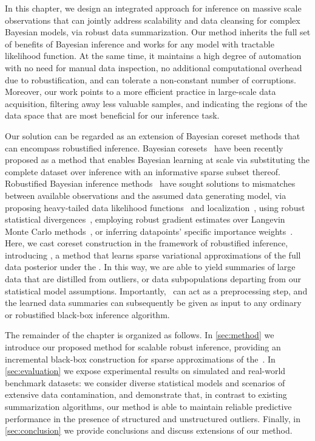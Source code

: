 In this chapter, we design an integrated approach for inference on massive scale observations that can jointly address scalability and data cleansing for complex Bayesian models, via robust data summarization. Our method inherits the full set of benefits of Bayesian inference and works for any model with tractable likelihood function. At the same time, it maintains a high degree of automation with no need for manual data inspection, no additional computational overhead due to robustification, and can tolerate a non-constant number of corruptions. Moreover, our work points to a more efficient practice in large-scale data acquisition, filtering away less valuable samples, and indicating the regions of the data space that are most beneficial for our inference task. 

Our solution can be regarded as an extension of Bayesian coreset methods that can encompass robustified inference. Bayesian coresets~\citep{huggins16, campbell19jmlr, campbell19neurips} have been recently proposed as a method that enables Bayesian learning at scale via substituting the complete dataset over inference with an informative sparse subset thereof. Robustified Bayesian inference methods~\citep{berger94} have sought solutions to mismatches between available observations and the assumed data generating model, via proposing heavy-tailed data likelihood functions~\citep{huber09, insua12} and localization~\citep{definetti61, wang18}, using robust statistical divergences~\citep{futami18, knoblauch18, miller19}, employing robust gradient estimates over Langevin Monte Carlo methods~\citep{bhatia19}, or inferring datapoints' specific importance weights~\citep{wang17}. Here, we cast coreset construction in the framework of robustified inference, introducing \emph{\bcores{}}, a method that learns sparse variational approximations of the full data posterior under the \bdiv{}. In this way, we are able to yield summaries of large data that are distilled from outliers, or data subpopulations departing from our statistical model assumptions. Importantly, \mbox{\bcores}~can act as a preprocessing step, and the learned data summaries can subsequently be given as input to any ordinary or robustified black-box inference algorithm.

The remainder of the chapter is organized as follows. In \cref{sec:method} we introduce our proposed method for scalable robust inference, providing an incremental black-box construction for sparse approximations of the~\bpost. In \cref{sec:evaluation} we expose experimental results on simulated and real-world benchmark datasets: we consider diverse statistical models and scenarios of extensive data contamination, and demonstrate that, in contrast to existing summarization algorithms, our method is able to maintain reliable predictive performance in the presence of structured and unstructured outliers. Finally, in \cref{sec:conclusion} we provide conclusions and discuss extensions of our method.





